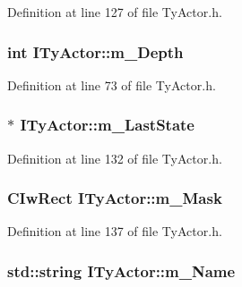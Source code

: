 Definition at line 127 of file TyActor.h.

\hypertarget{class_i_ty_actor_ac075325d62fdcda89c2a91f2c1298376}{
\subsubsection[{m\_\-Depth}]{\setlength{\rightskip}{0pt plus 5cm}int {\bf ITyActor::m\_\-Depth}}}
\label{class_i_ty_actor_ac075325d62fdcda89c2a91f2c1298376}


Definition at line 73 of file TyActor.h.

\hypertarget{class_i_ty_actor_ab637fbe1df811cbde3ad2b780f1ea643}{
\subsubsection[{m\_\-LastState}]{$\ast$ {\bf ITyActor::m\_\-LastState}}}
\label{class_i_ty_actor_ab637fbe1df811cbde3ad2b780f1ea643}


Definition at line 132 of file TyActor.h.

\hypertarget{class_i_ty_actor_abd0ddacb8e677d2d36ead794883dee4c}{
\subsubsection[{m\_\-Mask}]{\setlength{\rightskip}{0pt plus 5cm}CIwRect {\bf ITyActor::m\_\-Mask}}}
\label{class_i_ty_actor_abd0ddacb8e677d2d36ead794883dee4c}


Definition at line 137 of file TyActor.h.

\hypertarget{class_i_ty_actor_afdfb0e1ed5a47085f52f95f276010bb6}{
\subsubsection[{m\_\-Name}]{\setlength{\rightskip}{0pt plus 5cm}std::string {\bf ITyActor::m\_\-Name}}}
\label{class_i_ty_actor_afdfb0e1ed5a47085f52f95f276010bb6}


